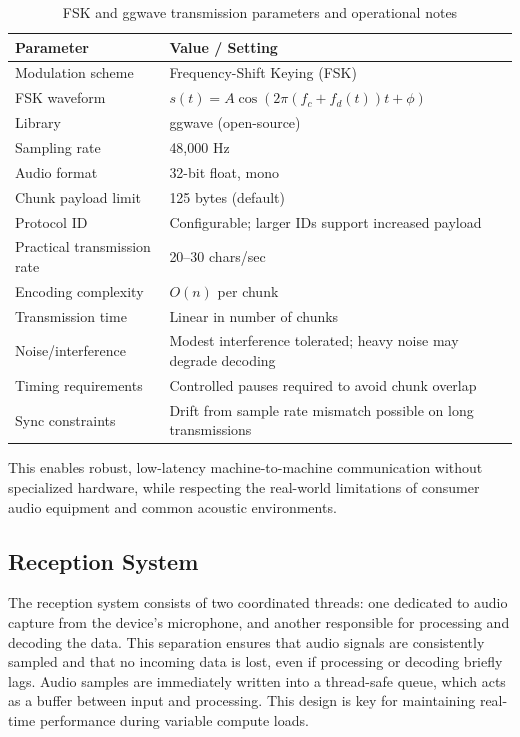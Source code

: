 \documentclass[12pt,openany]{article}
\theoremstyle{definition}
\theoremstyle{definition}
\theoremstyle{definition}
\begin{document}
\begin{table}[h]
\begin{adjustwidth}{-5cm}{-5cm}
\centering
\begin{tabular}{|l|l|}
\hline
\textbf{Parameter}         & \textbf{Value / Setting} \\
\hline
Modulation scheme          & Frequency-Shift Keying (FSK) \\
FSK waveform               & $s(t) = A \cos(2\pi(f_c + f_d(t))t + \phi)$\\
Library                    & ggwave (open-source)     \\
Sampling rate              & 48,000 Hz                \\
Audio format               & 32-bit float, mono       \\
Chunk payload limit        & 125 bytes (default)      \\
Protocol ID                & Configurable; larger IDs support increased payload \\
Practical transmission rate & 20–30 chars/sec          \\
Encoding complexity        & $O(n)$ per chunk         \\
Transmission time          & Linear in number of chunks    \\
Noise/interference         & Modest interference tolerated; heavy noise may degrade decoding  \\
Timing requirements        & Controlled pauses required to avoid chunk overlap \\
Sync constraints           & Drift from sample rate mismatch possible on long transmissions \\
\hline
\end{tabular}
\end{adjustwidth}
\caption{FSK and ggwave transmission parameters and operational notes}
\end{table}
This enables robust, low-latency machine-to-machine communication without specialized hardware, while respecting the real-world limitations of consumer audio equipment and common acoustic environments.

\subsection*{Reception System}
The reception system consists of two coordinated threads: one dedicated to audio capture from the device’s microphone, and another responsible for processing and decoding the data. This separation ensures that audio signals are consistently sampled and that no incoming data is lost, even if processing or decoding briefly lags. Audio samples are immediately written into a thread-safe queue, which acts as a buffer between input and processing. This design is key for maintaining real-time performance during variable compute loads.
\end{document}
